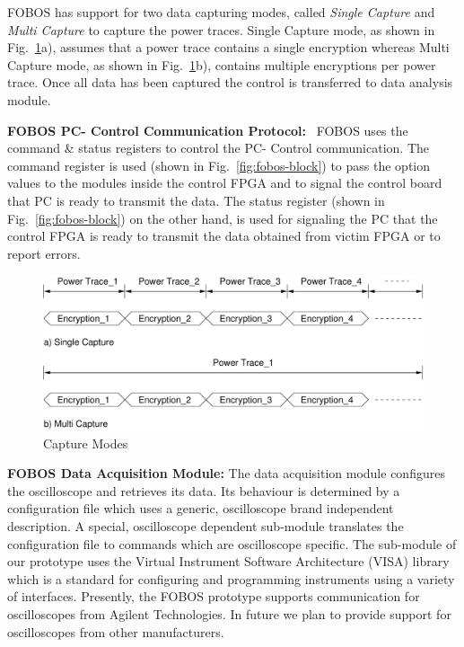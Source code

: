 \documentclass{llncs}
\numberwithin{algorithm}{chapter}
\begin{document}
FOBOS has support for two data capturing modes, called \emph{Single Capture} and \emph{Multi Capture}
to capture the power traces. Single Capture mode, as shown in Fig.~\ref{fig:fobos-captmet}a), assumes that
a power trace contains a single encryption whereas Multi Capture mode, as shown in 
Fig.~\ref{fig:fobos-captmet}b), contains multiple encryptions per power trace. 
Once all data has been captured the control is transferred to data analysis module.  

\textbf{FOBOS PC- Control Communication Protocol:}~\label{pcccp}
FOBOS uses the command \& status registers to control the PC- Control communication.
The command register is used (shown in Fig.~\ref{fig:fobos-block}) to pass the 
option values to the modules inside the control FPGA and 
to signal the control board that PC is ready to transmit the data.
The status register (shown in Fig.~\ref{fig:fobos-block}) on the other hand, is used for
signaling the PC that the control FPGA is ready to transmit the data obtained from 
victim FPGA or to report errors. 
\begin{figure}[ht]
\begin{center}
\includegraphics[scale=0.6]{figures/capture_methods}
\caption{\label{fig:fobos-captmet}Capture Modes}
\end{center} 
\vspace{-3ex}
\end{figure}

\textbf{FOBOS Data Acquisition Module:}
The data acquisition module configures the oscilloscope and retrieves its data.
Its behaviour is determined by a configuration file which uses a generic,
oscilloscope brand independent description. A special, oscilloscope dependent
sub-module translates the configuration file to commands which are oscilloscope specific. 
The sub-module of our prototype uses the Virtual Instrument Software Architecture (VISA) 
library which is a standard for configuring and programming instruments using a
variety of interfaces.
Presently, the FOBOS prototype supports communication for oscilloscopes from Agilent 
Technologies. In future we plan to provide support for oscilloscopes from other
manufacturers.
\end{document}

